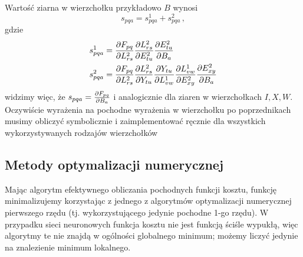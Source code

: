 \documentclass{myclass}
\begin{document}
Wartość ziarna w wierzchołku przykładowo \(B\) wynosi
\begin{equation*}
    s_{pqa} = s_{pqa}^1 + s_{pqa}^2\,,
\end{equation*}
gdzie
\begin{equation*}
    \begin{split}
        &s_{pqa}^1 = \pdv{F_{pq}}{L_{rs}^2}\pdv{L_{rs}^2}{E_{tu}^2}\pdv{E_{tu}^2}{B_{a}}\\
        &s_{pqa}^2 = \pdv{F_{pq}}{L_{rs}^2}\pdv{L_{rs}^2}{Y_{tu}}\pdv{Y_{tu}}{L_{vw}^1}\pdv{L_{vw}^1}{E_{xy}^2}\pdv{E_{xy}^2}{B_{a}}
    \end{split}
\end{equation*}
widzimy więc, że \(s_{pqa} = \pdv{F_{pq}}{B_a}\) i analogicznie dla ziaren w wierzchołkach \(I, X,
W\). Oczywiście wyrażenia na pochodne wyrażenia w wierzchołku po poprzednikach musimy obliczyć
symbolicznie i zaimplementować ręcznie dla wszystkich wykorzystywanych rodzajów wierzchołków

\subsection{Metody optymalizacji numerycznej}

Mając algorytm efektywnego obliczania pochodnych funkcji kosztu, funkcję minimalizujemy korzystając
z jednego z algorytmów optymalizacji numerycznej pierwszego rzędu (tj. wykorzystującego jedynie
pochodne 1-go rzędu). W przypadku sieci neuronowych funkcja kosztu nie jest funkcją ściśle wypukłą,
więc algorytmy te nie znajdą w ogólności globalnego minimum; możemy liczyć jedynie na znalezienie
minimum lokalnego.
\end{document}
